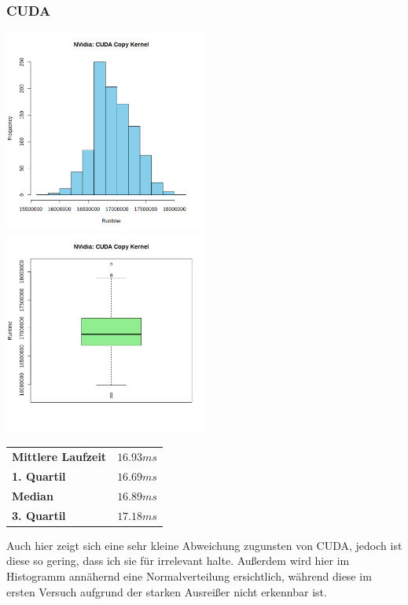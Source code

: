 \documentclass[12pt]{article}
\begin{document}
	\subsubsection*{CUDA}
	\includegraphics[width=0.5\textwidth]{../statistics/nvidia/cuda/histogram_copy.png}
	\includegraphics[width=0.5\textwidth]{../statistics/nvidia/cuda/boxplot_copy.png}
	\\
	\begin{center}
		\begin{tabular}{|l|l|}
			\toprule
			\textbf{Mittlere Laufzeit} 		& $16.93ms$ \\
			\textbf{1. Quartil}				& $16.69ms$ \\
			\textbf{Median}					& $16.89ms$  \\
			\textbf{3. Quartil}				& $17.18ms$  \\
			\bottomrule
		\end{tabular}
	\end{center}
	\medskip
	Auch hier zeigt sich eine sehr kleine Abweichung zugunsten von CUDA, jedoch ist diese so gering, dass ich sie für irrelevant halte.
	Außerdem wird hier im Histogramm annähernd eine Normalverteilung ersichtlich, während diese im ersten Versuch aufgrund der starken Ausreißer nicht erkennbar ist.
	
	
	
	
	
	
	
	
\end{document}
